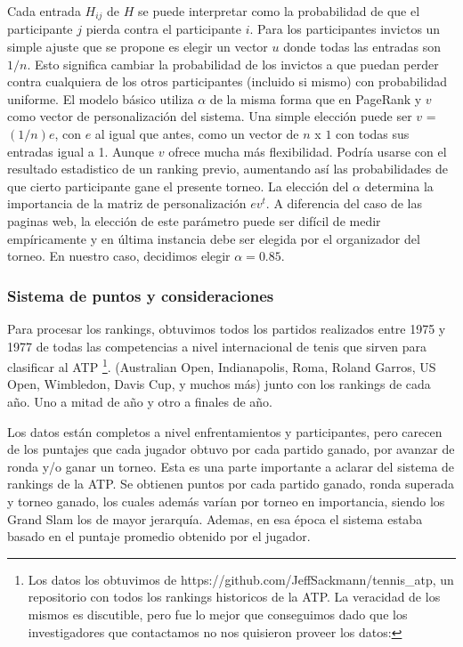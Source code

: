 Cada entrada $H_{ij}$ de $H$ se puede interpretar como la probabilidad de que el participante $j$ pierda contra el participante $i$. Para los participantes invictos un simple ajuste que se propone es elegir un vector $u$ donde todas las entradas son $1/n$. Esto significa cambiar la probabilidad de los invictos a que puedan perder contra cualquiera de los otros participantes (incluido si mismo) con probabilidad uniforme.
El modelo básico utiliza $\alpha$ de la misma forma que en PageRank y $v$ como vector de personalización del sistema. Una simple elección puede ser $v$ = $(1/n)e$, con $e$ al igual que antes, como un vector de $n$ x $1$ con todas sus entradas igual a 1. Aunque $v$ ofrece mucha más flexibilidad. Podría usarse con el resultado estadistico de un ranking previo, aumentando así las probabilidades de que cierto participante gane el presente torneo.
La elección del $\alpha$ determina la importancia de la matriz de personalización $ev^t$. A diferencia del caso de las paginas web, la elección de este parámetro puede ser difícil de medir empíricamente y en última instancia debe ser elegida por el organizador del torneo. En nuestro caso, decidimos elegir $\alpha = 0.85$.	 

\subsubsection{Sistema de puntos y consideraciones}

Para procesar los rankings, obtuvimos todos los partidos realizados entre 1975 y 1977 de todas las competencias a nivel internacional de tenis que sirven para clasificar al ATP \footnote{Los datos los obtuvimos de https://github.com/JeffSackmann/tennis\_atp, un repositorio con todos los rankings historicos de la ATP. La veracidad de los mismos es discutible, pero fue lo mejor que conseguimos dado que los investigadores que contactamos no nos quisieron proveer los datos: }. (Australian Open, Indianapolis, Roma, Roland Garros, US Open, Wimbledon, Davis Cup, y muchos más) junto con los rankings de cada año. Uno a mitad de año y otro a finales de año. 

Los datos están completos a nivel enfrentamientos y participantes, pero carecen de los puntajes que cada jugador obtuvo por cada partido ganado, por avanzar de ronda y/o ganar un torneo.
Esta es una parte importante a aclarar del sistema de rankings de la ATP. Se obtienen puntos por cada partido ganado, ronda superada y torneo ganado, los cuales además varían por torneo en importancia, siendo los Grand Slam los de mayor jerarquía. Ademas, en esa época el sistema estaba basado en el puntaje promedio obtenido por el jugador.


